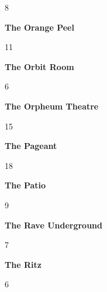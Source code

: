 \begin{center}8\end{center} 
\newline 
\begin{center}\textbf{The Orange Peel}\end{center}
\begin{center}11\end{center} 
\newline 
\begin{center}\textbf{The Orbit Room}\end{center}
\begin{center}6\end{center} 
\newline 
\begin{center}\textbf{The Orpheum Theatre}\end{center}
\begin{center}15\end{center} 
\newline 
\begin{center}\textbf{The Pageant}\end{center}
\begin{center}18\end{center} 
\newline 
\begin{center}\textbf{The Patio}\end{center}
\begin{center}9\end{center} 
\newline 
\begin{center}\textbf{The Rave Underground}\end{center}
\begin{center}7\end{center} 
\newline 
\begin{center}\textbf{The Ritz}\end{center}
\begin{center}6\end{center} 
\newline 
